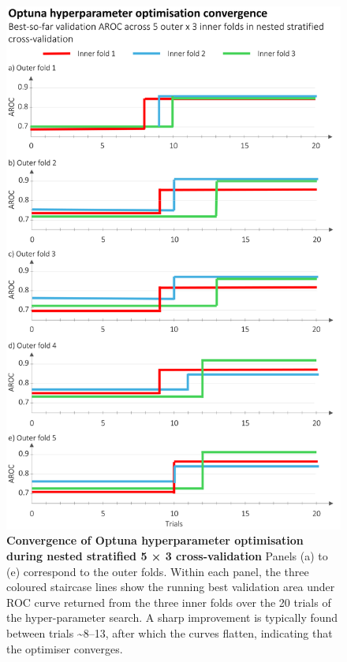 \begin{figure}[htbp]
\centering
\includegraphics[width=\textwidth]{optuna_optimasation_convergence.png}
\caption{\textbf{Convergence of Optuna hyperparameter optimisation during nested stratified 5 × 3 cross-validation} Panels (a) to (e) correspond to the outer folds. Within each panel, the three coloured staircase lines show the running best validation area under ROC curve returned from the three inner folds over the 20 trials of the hyper-parameter search. A sharp improvement is typically found between trials \sim8–13, after which the curves flatten, indicating that the optimiser converges.}
\label{fig:optuna_optimasation_convergence}
\end{figure}

